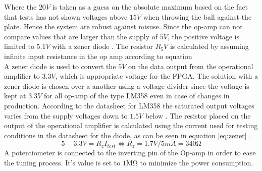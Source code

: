 Where the $20V$ is taken as a guess on the absolute maximum based on the fact that tests has not shown voltages above $15V$ when throwing the ball against the plate. Hence the system are robust against misuse.
Since the op-amp can not compare values that are larger than the supply of $5V$, the positive voltage is limited to $5.1V$ with a zener diode \cite{zener}. The resistor $R_5V$ is calculated by assuming infinite input resistance in the op amp according to equation 
\begin{equation}
\label{eq:zener5VResistor}
\end{equation}
A zener diode \cite{zener} is used to convert the $5V$ on the data output from the operational amplifier to $3.3V$, which is appropriate voltage for the FPGA. The solution with a zener diode is chosen over a another using a voltage divider since the voltage is kept at $3.3V$ for all op-amp of the type LM358 even in case of changes in production. According to the datasheet for LM358 the saturated output voltages varies from the supply voltages down to $1.5V$ below \cite{lm358}.
The resistor placed on the output of the operational amplifier is calculated using the current used for testing conditions in the datasheet for the diode, as can be seen in equation \ref{eq:zener} \cite{zener}.
\begin{equation}
5-3.3V = R_{z} I_{test} \Leftrightarrow R_{z} = 1.7V/5mA = 340\si{\ohm}
\label{eq:zener}
\end{equation}
% 
A potentiometer is connected to the inverting pin of the Op-amp in order to ease the tuning process. It's value is set to $1\si{\mega\ohm}$ to minimize the power consumption.

